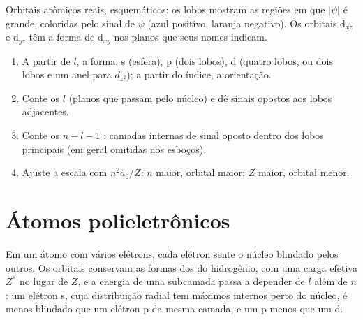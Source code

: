 \begin{omfigure}

{\small Orbitais atômicos reais, esquemáticos: os lobos mostram as regiões em
que $|\psi|$ é grande, coloridas pelo sinal de $\psi$ (azul positivo, laranja
negativo). Os orbitais $\mathrm d_{xz}$ e $\mathrm d_{yz}$ têm a forma de
$\mathrm d_{xy}$ nos planos que seus nomes indicam.}
\end{omfigure}

\begin{method}\label{met:b2:atomic-orbitals:draw-orbital}
\begin{enumerate}
  \item A partir de $l$, a forma: s (esfera), p (dois lobos), d (quatro lobos,
        ou dois lobos e um anel para $d_{z^2}$); a partir do índice, a orientação.
  \item Conte os $l$  (planos que passam pelo núcleo) e dê sinais
        opostos aos lobos adjacentes.
  \item Conte os $n - l - 1$ : camadas internas de sinal oposto
        dentro dos lobos principais (em geral omitidas nos esboços).
  \item Ajuste a escala com $n^2a_0/Z$: $n$ maior, orbital maior; $Z$ maior,
        orbital menor.
\end{enumerate}
\end{method}

\section{Átomos polieletrônicos}

Em um átomo com vários elétrons, cada elétron sente o núcleo blindado pelos
outros. Os orbitais conservam as formas dos do hidrogênio, com uma carga
efetiva $Z^*$ no lugar de $Z$, e a energia de uma subcamada passa a depender de
$l$ além de $n$: um elétron s, cuja distribuição radial tem máximos internos
perto do núcleo, é menos blindado que um elétron p da mesma camada, e um p
menos que um d.

